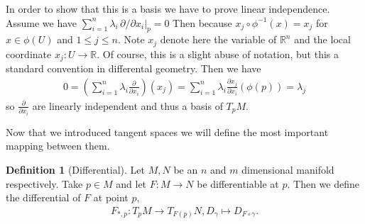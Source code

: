 \documentclass[12pt,a4paper]{article}
\numberwithin{equation}{subsection}
\numberwithin{lemma}{subsection}
\theoremstyle{definition}
\newtheorem{definition}[lemma]{Definition}
\newcommand{\real}{\mathbb{R}}
\begin{document}
In order to show that this is a basis we have to prove linear independence.
Assume we have $\sum_{i=1}^n \lambda_i \, \partial/\partial x_i|_p = 0$
Then because $x_j \circ \phi^{-1} (x) = x_j$ for $x \in \phi(U)$ and 
$1 \leq j \leq n$. Note $x_j$ denote here the variable of 
$\real^n$ and the local coordinate $x_j:U \rightarrow \real$. Of course, 
this is a slight abuse of notation, but this a standard convention in 
differental geometry.
Then we have 
\begin{align*}
    0 = \left( \sum\limits_{i=1}^n \lambda_i \frac{\partial}{\partial x_i}
        \right) (x_j)
    = \sum\limits_{i=1}^n \lambda_i \frac{\partial x_j}{\partial x_i}(\phi(p))
    = \lambda_j
\end{align*}
so $\frac{\partial}{\partial x_i}$ are
linearly independent and thus a basis of $T_p M$. 

Now that we introduced tangent spaces we will define the most important 
mapping between them.
\begin{definition}[Differential]
    Let $M, N$ be an $n$ and $m$ dimensional manifold respectively. 
    Take $p \in M$ and let $F:M \rightarrow N$ be differentiable at $p$. 
    Then we define the differential of $F$ at point $p$,
    \begin{align*}
        F_{*,p}: T_p M \rightarrow T_{F(p)} N, D_\gamma \mapsto D_{F\circ \gamma}.
    \end{align*}
\end{definition}
\end{document}
